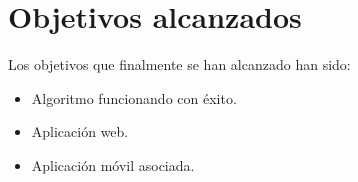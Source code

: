 \section{Objetivos alcanzados}\label{objetivos-alcanzados}
Los objetivos que finalmente se han alcanzado han sido: 
\begin{itemize}
\tightlist
\item
  Algoritmo funcionando con éxito.
\item
  Aplicación web. 
\item
  Aplicación móvil asociada.
\end{itemize}

